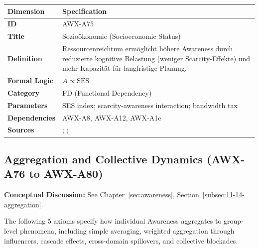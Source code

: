 \begin{table}[htbp]
\small
\begin{tabular}{p{3cm}p{11cm}}
\toprule
\textbf{Dimension} & \textbf{Specification} \\
\midrule
\textbf{ID} & AWX-A75 \\
\textbf{Title} & Sozioökonomie (Socioeconomic Status) \\
\textbf{Definition} & Ressourcenreichtum ermöglicht höhere Awareness durch reduzierte kognitive Belastung (weniger Scarcity-Effekte) und mehr Kapazität für langfristige Planung. \\
\textbf{Formal Logic} & $A \propto \text{SES}$ \\
\textbf{Category} & FD (Functional Dependency) \\
\textbf{Parameters} & SES index; scarcity-awareness interaction; bandwidth tax \\
\textbf{Dependencies} & AWX-A8, AWX-A12, AWX-A1c \\
\textbf{Sources} & \citet{mani2013poverty}; \citet{PAP-mullainathan2013scarcity}; \citet{haushofer2014psychology} \\
\bottomrule
\end{tabular}
\end{table}




\subsection{Aggregation and Collective Dynamics (AWX-A76 to AWX-A80)}

\begin{cross-reference}
\textbf{Conceptual Discussion:} See Chapter~\ref{sec:awareness}, Section~\ref{subsec:11-14-aggregation}.
\end{cross-reference}
The following 5 axioms specify how individual Awareness aggregates to group-level phenomena, including simple averaging, weighted aggregation through influencers, cascade effects, cross-domain spillovers, and collective blockades.


